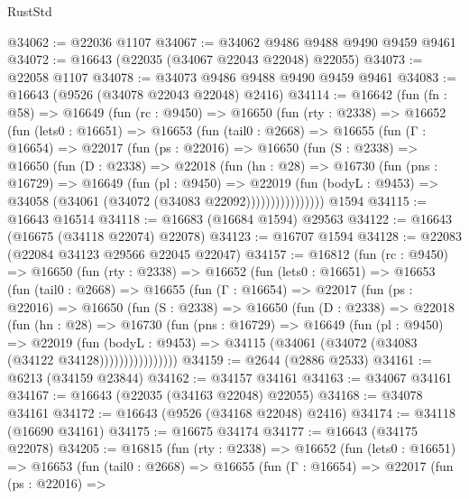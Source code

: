 \begin{lexlean}{RustStd}
\begin{coremodule}
@34062 := @22036 @1107
@34067 := @34062 @9486 @9488 @9490 @9459 @9461
@34072 := @16643 (@22035 (@34067 @22043 @22048) @22055)
@34073 := @22058 @1107
@34078 := @34073 @9486 @9488 @9490 @9459 @9461
@34083 := @16643 (@9526 (@34078 @22043 @22048) @2416)
@34114 := @16642
    (fun (fn : @58) =>
    @16649
      (fun (rc : @9450) =>
      @16650
        (fun (rty : @2338) =>
        @16652
          (fun (lets0 : @16651) =>
          @16653
            (fun (tail0 : @2668) =>
            @16655
              (fun (Γ : @16654) =>
              @22017
                (fun (ps : @22016) =>
                @16650
                  (fun (S : @2338) =>
                  @16650
                    (fun (D : @2338) =>
                    @22018
                      (fun (hn : @28) =>
                      @16730
                        (fun (pns : @16729) =>
                        @16649
                          (fun (pl : @9450) =>
                          @22019
                            (fun (bodyL : @9453) =>
                            @34058 (@34061 (@34072 (@34083 @22092))))))))))))))))
    @1594
@34115 := @16643 @16514
@34118 := @16683 (@16684 @1594) @29563
@34122 := @16643 (@16675 (@34118 @22074) @22078)
@34123 := @16707 @1594
@34128 := @22083 (@22084 @34123 @29566 @22045 @22047)
@34157 := @16812
    (fun (rc : @9450) =>
    @16650
      (fun (rty : @2338) =>
      @16652
        (fun (lets0 : @16651) =>
        @16653
          (fun (tail0 : @2668) =>
          @16655
            (fun (Γ : @16654) =>
            @22017
              (fun (ps : @22016) =>
              @16650
                (fun (S : @2338) =>
                @16650
                  (fun (D : @2338) =>
                  @22018
                    (fun (hn : @28) =>
                    @16730
                      (fun (pns : @16729) =>
                      @16649
                        (fun (pl : @9450) =>
                        @22019
                          (fun (bodyL : @9453) =>
                          @34115 (@34061 (@34072 (@34083 (@34122 @34128))))))))))))))))
@34159 := @2644 (@2886 @2533)
@34161 := @6213 (@34159 @23844)
@34162 := @34157 @34161
@34163 := @34067 @34161
@34167 := @16643 (@22035 (@34163 @22048) @22055)
@34168 := @34078 @34161
@34172 := @16643 (@9526 (@34168 @22048) @2416)
@34174 := @34118 (@16690 @34161)
@34175 := @16675 @34174
@34177 := @16643 (@34175 @22078)
@34205 := @16815
    (fun (rty : @2338) =>
    @16652
      (fun (lets0 : @16651) =>
      @16653
        (fun (tail0 : @2668) =>
        @16655
          (fun (Γ : @16654) =>
          @22017
            (fun (ps : @22016) =>

\end{coremodule}
\end{lexlean}
